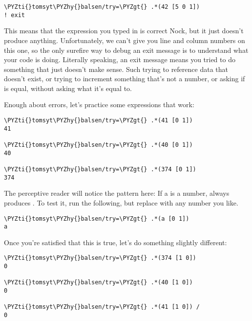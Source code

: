 \begin{framed_shaded}
\begin{Verbatim}[fontsize=\relsize{-2.5},fontseries=b,commandchars=\\\{\}]
\PYZti{}tomsyt\PYZhy{}balsen/try=\PYZgt{} .*(42 [5 0 1]) 
! exit
\end{Verbatim}
\end{framed_shaded}
This means that the expression you typed in is correct Nock, but it just
doesn't produce anything. Unfortunately, we can't give you line and column
numbers on this one, so the only surefire way to debug an exit message is to
understand what your code is doing. Literally speaking, an exit message means
you tried to do something that just doesn't make sense. Such trying to
reference data that doesn't exist, or trying to increment something that's not
a number, or asking if  is equal, without asking what it's equal to.

Enough about errors, let's practice some expressions that work:

\begin{framed_shaded}
\begin{Verbatim}[fontsize=\relsize{-2.5},fontseries=b,commandchars=\\\{\}]
\PYZti{}tomsyt\PYZhy{}balsen/try=\PYZgt{} .*(41 [0 1]) 
41

\PYZti{}tomsyt\PYZhy{}balsen/try=\PYZgt{} .*(40 [0 1]) 
40

\PYZti{}tomsyt\PYZhy{}balsen/try=\PYZgt{} .*(374 [0 1]) 
374
\end{Verbatim}
\end{framed_shaded}

The perceptive reader will notice the pattern here: If a is a number,  always produces . To test it, run the following, but
replace  with any number you like.

\begin{framed_shaded}
\begin{Verbatim}[fontsize=\relsize{-2.5},fontseries=b,commandchars=\\\{\}]
\PYZti{}tomsyt\PYZhy{}balsen/try=\PYZgt{} .*(a [0 1]) 
a
\end{Verbatim}
\end{framed_shaded}

Once you're satisfied that this is true, let's do something slightly
different:

\begin{framed_shaded}
\begin{Verbatim}[fontsize=\relsize{-2.5},fontseries=b,commandchars=\\\{\}]
\PYZti{}tomsyt\PYZhy{}balsen/try=\PYZgt{} .*(374 [1 0]) 
0

\PYZti{}tomsyt\PYZhy{}balsen/try=\PYZgt{} .*(40 [1 0]) 
0

\PYZti{}tomsyt\PYZhy{}balsen/try=\PYZgt{} .*(41 [1 0]) /
0
\end{Verbatim}
\end{framed_shaded}

